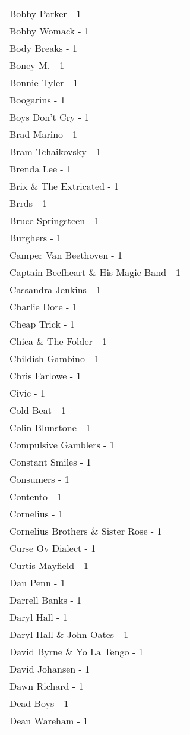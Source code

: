 \documentclass[
]{article}
\begin{document}
\begin{longtable}{l}
Bobby Parker - 1 \\ 
Bobby Womack - 1 \\ 
Body Breaks - 1 \\ 
Boney M. - 1 \\ 
Bonnie Tyler - 1 \\ 
Boogarins - 1 \\ 
Boys Don't Cry - 1 \\ 
Brad Marino - 1 \\ 
Bram Tchaikovsky - 1 \\ 
Brenda Lee - 1 \\ 
Brix \& The Extricated - 1 \\ 
Brrds - 1 \\ 
Bruce Springsteen - 1 \\ 
Burghers - 1 \\ 
Camper Van Beethoven - 1 \\ 
Captain Beefheart \& His Magic Band - 1 \\ 
Cassandra Jenkins - 1 \\ 
Charlie Dore - 1 \\ 
Cheap Trick - 1 \\ 
Chica \& The Folder - 1 \\ 
Childish Gambino - 1 \\ 
Chris Farlowe - 1 \\ 
Civic - 1 \\ 
Cold Beat - 1 \\ 
Colin Blunstone - 1 \\ 
Compulsive Gamblers - 1 \\ 
Constant Smiles - 1 \\ 
Consumers - 1 \\ 
Contento - 1 \\ 
Cornelius - 1 \\ 
Cornelius Brothers \& Sister Rose - 1 \\ 
Curse Ov Dialect - 1 \\ 
Curtis Mayfield - 1 \\ 
Dan Penn - 1 \\ 
Darrell Banks - 1 \\ 
Daryl Hall - 1 \\ 
Daryl Hall \& John Oates - 1 \\ 
David Byrne \& Yo La Tengo - 1 \\ 
David Johansen - 1 \\ 
Dawn Richard - 1 \\ 
Dead Boys - 1 \\ 
Dean Wareham - 1 \\ 

\end{longtable}
\end{document}
